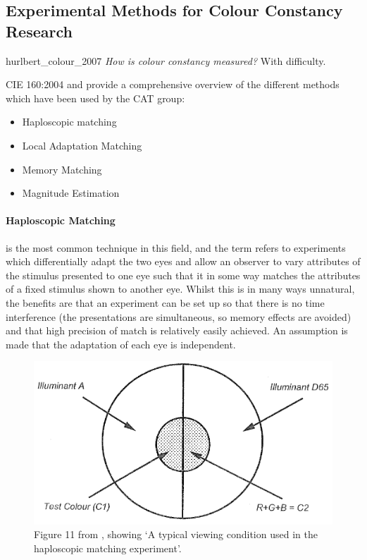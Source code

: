 \subsection{Experimental Methods for Colour Constancy Research}

\begin{citequote}{hurlbert_colour_2007}
\emph{How is colour constancy measured?} With difficulty.
\end{citequote}

CIE 160:2004 \citep{cie_tc_1-52_cie_2004} and \citet{luo_review_2000} provide a comprehensive overview of the different methods which have been used by the \gls{CAT} group:

\begin{itemize}
\item Haploscopic matching
\item Local Adaptation Matching
\item Memory Matching
\item Magnitude Estimation
\end{itemize}


\paragraph{Haploscopic Matching} is the most common technique in this field, and the term refers to experiments which differentially adapt the two eyes and allow an observer to vary attributes of the stimulus presented to one eye such that it in some way matches the attributes of a fixed stimulus shown to another eye. Whilst this is in many ways unnatural, the benefits are that an experiment can be set up so that there is no time interference (the presentations are simultaneous, so memory effects are avoided) and that high precision of match is relatively easily achieved. An assumption is made that the adaptation of each eye is independent.

\begin{figure}[htbp]
    \includegraphics[max width=\textwidth]{figs/LitRev/hapl.png}
    \caption{Figure 11 from \citet{cie_tc_1-52_cie_2004}, showing `A typical viewing condition used in the haploscopic matching experiment'.}
    \label{fig:hapl}
\end{figure} 


